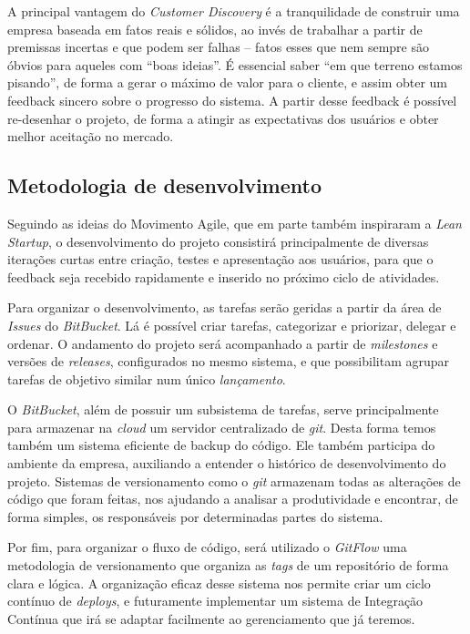 \documentclass[12pt,a4paper,twoside,hyphens,english,brazil]{abntex2}
\begin{document}
A principal vantagem do \emph{Customer Discovery} é a tranquilidade de construir uma empresa baseada em fatos reais e sólidos, ao invés de trabalhar a partir de premissas incertas e que podem ser falhas -- fatos esses que nem sempre são óbvios para aqueles com ``boas ideias''. É essencial saber ``em que terreno estamos pisando'', de forma a gerar o máximo de valor para o cliente, e assim obter um feedback sincero sobre o progresso do sistema. A partir desse feedback é possível re-desenhar o projeto, de forma a atingir as expectativas dos usuários e obter melhor aceitação no mercado.

\subsection{Metodologia de desenvolvimento}
Seguindo as ideias do Movimento Agile\cite{agile}, que em parte também inspiraram a \emph{Lean Startup}, o desenvolvimento do projeto consistirá principalmente de diversas iterações curtas entre criação, testes e apresentação aos usuários, para que o feedback seja recebido rapidamente e inserido no próximo ciclo de atividades.

Para organizar o desenvolvimento, as tarefas serão geridas a partir da área de \emph{Issues} do \emph{BitBucket}. Lá é possível criar tarefas, categorizar e priorizar, delegar e ordenar. O andamento do projeto será acompanhado a partir de \emph{milestones} e versões de \emph{releases}, configurados no mesmo sistema, e que possibilitam agrupar tarefas de objetivo similar num único \emph{lançamento}.

O \emph{BitBucket}, além de possuir um subsistema de tarefas, serve principalmente para armazenar na \emph{cloud} um servidor centralizado de \emph{git}. Desta forma temos também um sistema eficiente de backup do código. Ele também participa do ambiente da empresa, auxiliando a entender o histórico de desenvolvimento do projeto. Sistemas de versionamento como o \emph{git} armazenam todas as alterações de código que foram feitas, nos ajudando a analisar a produtividade e encontrar, de forma simples, os responsáveis por determinadas partes do sistema.

Por fim, para organizar o fluxo de código, será utilizado o \emph{GitFlow}\cite{gitflow} uma metodologia de versionamento que organiza as \emph{tags} de um repositório de forma clara e lógica. A organização eficaz desse sistema nos permite criar um ciclo contínuo de \emph{deploys}, e futuramente implementar um sistema de Integração Contínua\footnotemark{} que irá se adaptar facilmente ao gerenciamento que já teremos.
\end{document}
